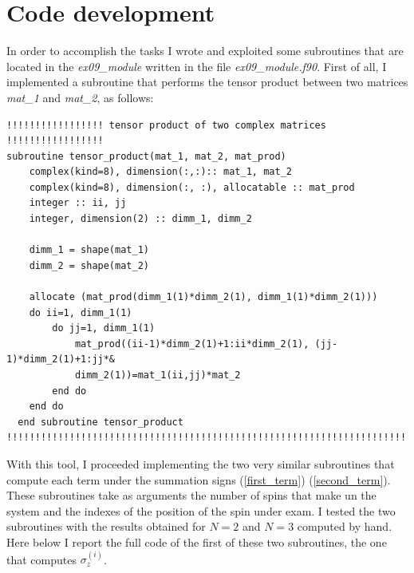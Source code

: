 \documentclass[prb,9pt,notitlepage]{revtex4-1}
\begin{document}
\section{Code development}
In order to accomplish the tasks I wrote and exploited some subroutines that are located in the \textit{ex09\_module} written in the file \textit{ex09\_module.f90}. First of all, I implemented a subroutine that performs the tensor product between two matrices \textit{mat\_1} and \textit{mat\_2}, as follows:
\begin{lstlisting}
!!!!!!!!!!!!!!!!! tensor product of two complex matrices !!!!!!!!!!!!!!!!!
subroutine tensor_product(mat_1, mat_2, mat_prod)
    complex(kind=8), dimension(:,:):: mat_1, mat_2
    complex(kind=8), dimension(:, :), allocatable :: mat_prod
    integer :: ii, jj
    integer, dimension(2) :: dimm_1, dimm_2

    dimm_1 = shape(mat_1)
    dimm_2 = shape(mat_2)

    allocate (mat_prod(dimm_1(1)*dimm_2(1), dimm_1(1)*dimm_2(1)))
    do ii=1, dimm_1(1)
        do jj=1, dimm_1(1)
            mat_prod((ii-1)*dimm_2(1)+1:ii*dimm_2(1), (jj-1)*dimm_2(1)+1:jj*&
            dimm_2(1))=mat_1(ii,jj)*mat_2
        end do
    end do
  end subroutine tensor_product
!!!!!!!!!!!!!!!!!!!!!!!!!!!!!!!!!!!!!!!!!!!!!!!!!!!!!!!!!!!!!!!!!!!!!!!!
\end{lstlisting}
With this tool, I proceeded implementing the two very similar subroutines that compute each term under the summation signs (\ref{first_term}) (\ref{second_term}). These subroutines take as arguments the number of spins that make un the system and the indexes of the position of the spin under exam. I tested the two subroutines with the results obtained for $N=2$ and $N=3$ computed by hand. Here below I report the full code of the first of these two subroutines, the one that computes $\sigma_z^{(i)}$.
\end{document}
